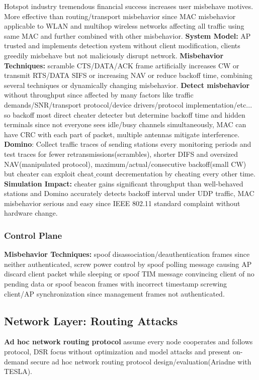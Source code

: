 \documentclass[9pt]{extarticle}
\begin{document}
\begin{multicols}{2}
Hotspot industry tremendous financial success increases user misbehave motives. More effective than routing/transport misbehavior since MAC misbehavior applicable to WLAN and multihop wireless networks affecting all traffic using same MAC and further combined with other misbehavior. \textbf{System Model:} AP trusted and implements detection system without client modification, clients greedily misbehave but not maliciously disrupt network.\textbf{ Misbehavior Techniques:} scramble CTS/DATA/ACK frame artificially increases CW or transmit RTS/DATA SIFS or increasing NAV or reduce backoff time, combining several techniques or dynamically changing misbehavior.\textbf{ Detect misbehavior} without throughput since affected by many factors like traffic demands/SNR/transport protocol/device drivers/protocol implementation/etc... so backoff most direct cheater detecter but determine backoff time and hidden terminals since not everyone sees idle/busy channels simultaneously, MAC can have CRC with each part of packet, multiple antennas mitigate interference. \textbf{Domino}: Collect traffic traces of sending stations every monitoring periods and test traces for fewer retransmissions(scrambles), shorter DIFS and oversized NAV(manipulated protocol), maximum/actual/consecutive backoff(small CW) but cheater can exploit cheat$\_$count decrementation by cheating every other time. \textbf{Simulation Impact:} cheater gains significant throughput than well-behaved stations and Domino accurately detects backoff interval under UDP traffic, MAC misbehavior serious and easy since IEEE 802.11 standard complaint without hardware change.

\subsubsection{Control Plane}

\textbf{Misbehavior Techniques:} spoof disassociation/deauthentication frames since neither authenticated, screw power control by spoof polling message causing AP discard client packet while sleeping or spoof TIM message convincing client of no pending data or spoof beacon frames with incorrect timestamp screwing client/AP synchronization since management frames not authenticated.

\subsection{Network Layer: Routing Attacks}

\textbf{Ad hoc network routing protocol} assume every node cooperates and follows protocol, DSR focus without optimization and model attacks and present on-demand secure ad hoc network routing protocol design/evaluation(Ariadne with TESLA). 


\end{multicols}
\end{document}
